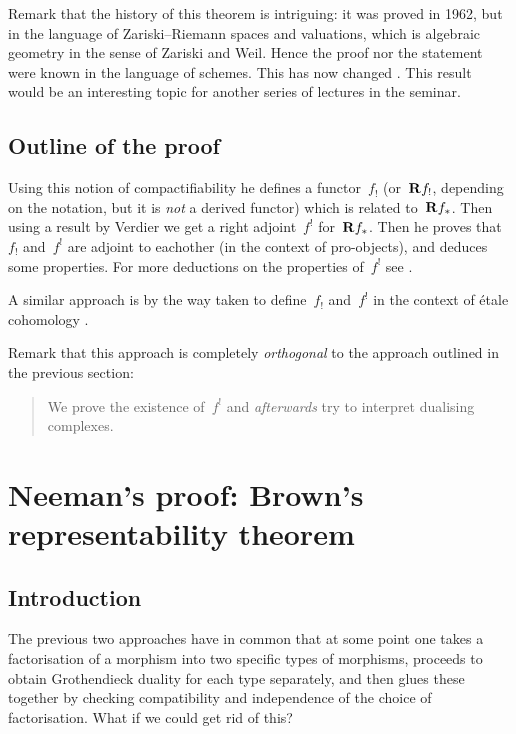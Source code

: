 Remark that the history of this theorem is intriguing: it was proved in 1962, but in the language of Zariski--Riemann spaces and valuations, which is algebraic geometry in the sense of Zariski and Weil. Hence the proof nor the statement were known in the language of schemes. This has now changed \cite{lutkebohmert-compactification,conrad-delignes-notes-nagata-compactification,deligne-plongement-de-nagata}. This result would be an interesting topic for another series of lectures in the seminar.

\subsection{Outline of the proof}
Using this notion of compactifiability he defines a functor~$f_!$ (or~$\mathbf{R} f_!$, depending on the notation, but it is \emph{not} a derived functor) which is related to~$\mathbf{R} f_*$. Then using a result by Verdier \cite{verdier-bourbaki-300} we get a right adjoint~$f^!$ for~$\mathbf{R} f_*$. Then he proves that~$f_!$ and~$f^!$ are adjoint to eachother (in the context of pro-objects), and deduces some properties. For more deductions on the properties of~$f^!$ see \cite{verdier-base-change-twisted-inverse-image}.

A similar approach is by the way taken to define~$f_!$ and~$f^!$ in the context of \'etale cohomology \cite[expos\'e XVII]{sga43}.

Remark that this approach is completely \emph{orthogonal} to the approach outlined in the previous section:
\begin{quote}
  We prove the existence of~$f^!$ and \emph{afterwards} try to interpret dualising complexes.
\end{quote}

\section{Neeman's proof: Brown's representability theorem}
\label{section:neeman}
\subsection{Introduction}
The previous two approaches have in common that at some point one takes a factorisation of a morphism into two specific types of morphisms, proceeds to obtain Grothendieck duality for each type separately, and then glues these together by checking compatibility and independence of the choice of factorisation. What if we could get rid of this?

